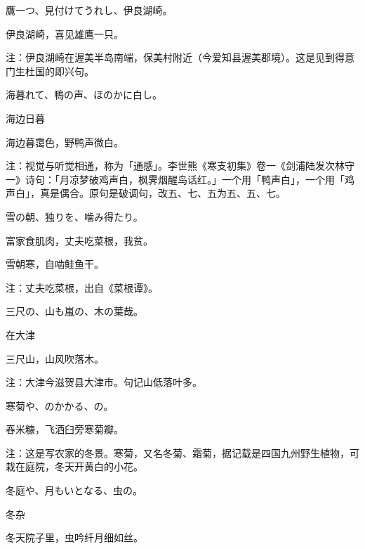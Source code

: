\begin{haiku}
    {\FH 鷹一つ、見付けてうれし、伊良湖崎。}

    {\FK 伊良湖崎，喜见雄鹰一只。}

    {\FT 注：伊良湖崎在渥美半岛南端，保美村附近（今爱知县渥美郡境）。这是见到得意门生杜国的即兴句。}
\end{haiku}

\begin{haiku}
    {\FH 海暮れて、鴨の声、ほのかに白し。}

    {\FK 海边日暮}

    {\FK 海边暮霭色，野鸭声微白。}

    {\FT 注：视觉与听觉相通，称为「通感」。李世熊《寒支初集》卷一《剑浦陆发次林守一》诗句：「月凉梦破鸡声白，枫霁烟醒鸟话红。」一个用「鸭声白」，一个用「鸡声白」，真是偶合。原句是破调句，改五、七、五为五、五、七。}
\end{haiku}

\begin{haiku}
    {\FH 雪の朝、独りを、噛み得たり。}

    {\FK 富家食肌肉，丈夫吃菜根，我贫。}

    {\FK 雪朝寒，自啮鲑鱼干。}

    {\FT 注：丈夫吃菜根，出自《菜根谭》。}
\end{haiku}

\begin{haiku}
    {\FH 三尺の、山も嵐の、木の葉哉。}

    {\FK 在大津}

    {\FK 三尺山，山风吹落木。}

    {\FT 注：大津今滋贺县大津市。句记山低落叶多。}
\end{haiku}

\begin{haiku}
    {\FH 寒菊や、のかかる、の。}

    {\FK 舂米糠，飞洒臼旁寒菊瓣。}

    {\FT 注：这是写农家的冬景。寒菊，又名冬菊、霜菊，据记载是四国九州野生植物，可栽在庭院，冬天开黄白的小花。}
\end{haiku}

\begin{haiku}
    {\FH 冬庭や、月もいとなる、虫の。}

    {\FK 冬杂}

    {\FK 冬天院子里，虫吟纤月细如丝。}
\end{haiku}

